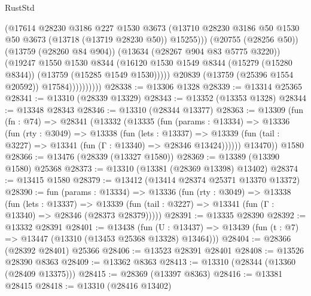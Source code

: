 \begin{lexlean}{RustStd}
\begin{coremodule}
                            (@17614
                              @28230
                              @3186
                              @227
                              @1530
                              @3673
                              (@13710
                                @28230
                                @3186
                                @50
                                @1530
                                @50
                                @3673
                                (@13718 (@13719 @28230 @50))
                                @15255)))
                          (@20755 (@28256 @50))
                          (@13759 (@28260 @84 @904))
                          (@13634 (@28267 @904 @83 @5775 @3220))
                          (@19247
                            @1550
                            @1530
                            @8344
                            (@16120
                              @1530
                              @1549
                              @8344
                              (@15279 (@15280 @8344))
                              (@13759 (@15285 @1549 @1530)))))
                        @20839
                        (@13759 (@25396 @1554 @20592))
                        @17584))))))))))
@28338 := @13306 @1328
@28339 := @13314 @25365
@28341 := @13310 (@28339 @13329)
@28343 := @13352 (@13353 @1328)
@28344 := @13348 @28343
@28346 := @13310 (@28344 @13377)
@28363 := @13309
    (fun (fn : @74) =>
    @28341
      (@13332
        (@13335
          (fun (params : @13334) =>
          @13336
            (fun (rty : @3049) =>
            @13338
              (fun (lets : @13337) =>
              @13339 (fun (tail : @3227) => @13341 (fun (Γ : @13340) => @28346 @13424))))))
        @13470))
    @1580
@28366 := @13476 (@28339 (@13327 @1580))
@28369 := @13389 (@13390 @1580) @25368
@28373 := @13310 (@13381 (@28369 @13398) @13402)
@28374 := @13415 @1580
@28379 := @13412 (@13414 @28374 @25371 @13370 @13372)
@28390 := fun (params : @13334) =>
  @13336
    (fun (rty : @3049) =>
    @13338
      (fun (lets : @13337) =>
      @13339 (fun (tail : @3227) => @13341 (fun (Γ : @13340) => @28346 (@28373 @28379)))))
@28391 := @13335 @28390
@28392 := @13332 @28391
@28401 := @13438
    (fun (U : @13437) => @13439 (fun (t : @7) => @13447 (@13310 (@13453 @25368 @13328) @13464)))
@28404 := @28366 (@28392 @28401) @25366
@28406 := @13523 @28391 @28401
@28408 := @13526 @28390 @8363
@28409 := @13362 @8363
@28413 := @13310 (@28344 (@13360 (@28409 @13375)))
@28415 := @28369 (@13397 @8363)
@28416 := @13381 @28415
@28418 := @13310 (@28416 @13402)

\end{coremodule}
\end{lexlean}
